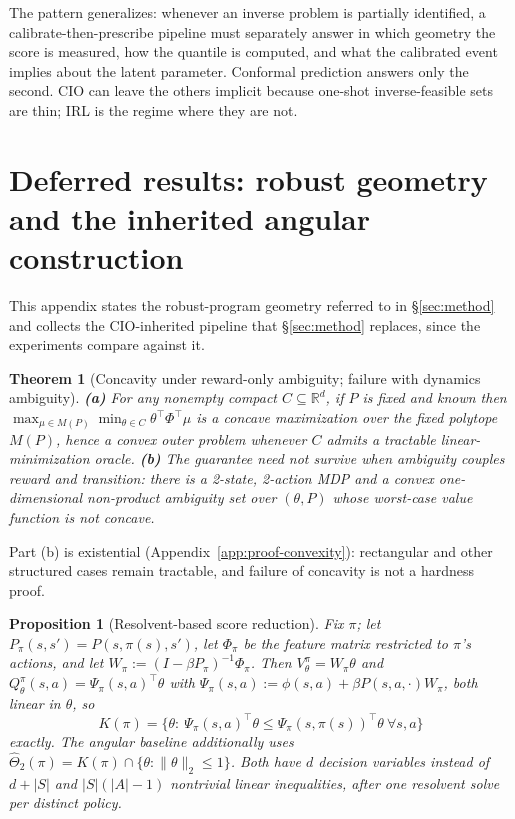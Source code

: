 \documentclass{article}
\newtheorem{theorem}{Theorem}
\newtheorem{proposition}{Proposition}
\begin{document}
The pattern generalizes: whenever an inverse problem is partially identified, a
calibrate-then-prescribe pipeline must separately answer in which geometry the
score is measured, how the quantile is computed, and what the calibrated event
implies about the latent parameter. Conformal prediction answers only the
second. CIO can leave the others implicit because one-shot inverse-feasible sets
are thin; IRL is the regime where they are not.



\appendix

\section{Deferred results: robust geometry and the inherited angular construction}
\label{app:angular}

This appendix states the robust-program geometry referred to in
\S\ref{sec:method} and collects the CIO-inherited pipeline that
\S\ref{sec:method} replaces, since the experiments compare against it.

\begin{theorem}[Concavity under reward-only ambiguity; failure with dynamics ambiguity]
\label{thm:convexity}
\textbf{(a)} For \emph{any} nonempty compact $C\subseteq\mathbb R^d$, if $P$ is
fixed and known then $\max_{\mu\in M(P)}\min_{\theta\in C}\theta^\top\Phi^\top\mu$
is a concave maximization over the fixed polytope $M(P)$, hence a convex outer
problem whenever $C$ admits a tractable linear-minimization oracle.
\textbf{(b)} The guarantee need not survive when ambiguity couples reward and
transition: there is a 2-state, 2-action MDP and a convex one-dimensional
non-product ambiguity set over $(\theta,P)$ whose worst-case value function is
not concave.
\end{theorem}

Part (b) is existential (Appendix~\ref{app:proof-convexity}): rectangular and
other structured cases remain tractable, and failure of concavity is not a
hardness proof.

\begin{proposition}[Resolvent-based score reduction]
\label{prop:resolvent}
Fix $\pi$; let $P_\pi(s,s')=P(s,\pi(s),s')$, let $\Phi_\pi$ be the feature
matrix restricted to $\pi$'s actions, and let $W_\pi:=(I-\beta
P_\pi)^{-1}\Phi_\pi$. Then $V^\pi_\theta=W_\pi\theta$ and
$Q^\pi_\theta(s,a)=\Psi_\pi(s,a)^\top\theta$ with
$\Psi_\pi(s,a):=\phi(s,a)+\beta P(s,a,\cdot)W_\pi$, both linear in $\theta$, so
\[
K(\pi)=\{\theta:\
\Psi_\pi(s,a)^\top\theta\le\Psi_\pi(s,\pi(s))^\top\theta\ \forall s,a\}
\]
exactly. The angular baseline additionally uses
$\hat\Theta_2(\pi)=K(\pi)\cap\{\theta:\|\theta\|_2\le1\}$. Both have $d$
decision variables instead of $d+|S|$ and $|S|(|A|-1)$ nontrivial linear
inequalities, after one resolvent solve per distinct policy.
\end{proposition}
\end{document}
